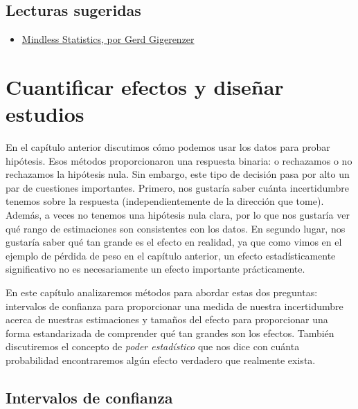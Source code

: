 \documentclass[
  12pt,
]{book}
\providecommand{\tightlist}{%
  \setlength{\itemsep}{0pt}\setlength{\parskip}{0pt}}
\begin{document}
\hypertarget{lecturas-sugeridas-6}{%
\section{Lecturas sugeridas}\label{lecturas-sugeridas-6}}

\begin{itemize}
\tightlist
\item
  \href{https://library.mpib-berlin.mpg.de/ft/gg/GG_Mindless_2004.pdf}{Mindless Statistics, por Gerd Gigerenzer}
\end{itemize}

\hypertarget{ci-effect-size-power}{%
\chapter{Cuantificar efectos y diseñar estudios}\label{ci-effect-size-power}}

En el capítulo anterior discutimos cómo podemos usar los datos para probar hipótesis. Esos métodos proporcionaron una respuesta binaria: o rechazamos o no rechazamos la hipótesis nula. Sin embargo, este tipo de decisión pasa por alto un par de cuestiones importantes. Primero, nos gustaría saber cuánta incertidumbre tenemos sobre la respuesta (independientemente de la dirección que tome). Además, a veces no tenemos una hipótesis nula clara, por lo que nos gustaría ver qué rango de estimaciones son consistentes con los datos. En segundo lugar, nos gustaría saber qué tan grande es el efecto en realidad, ya que como vimos en el ejemplo de pérdida de peso en el capítulo anterior, un efecto estadísticamente significativo no es necesariamente un efecto importante prácticamente.

En este capítulo analizaremos métodos para abordar estas dos preguntas: intervalos de confianza para proporcionar una medida de nuestra incertidumbre acerca de nuestras estimaciones y tamaños del efecto para proporcionar una forma estandarizada de comprender qué tan grandes son los efectos. También discutiremos el concepto de \emph{poder estadístico} que nos dice con cuánta probabilidad encontraremos algún efecto verdadero que realmente exista.

\hypertarget{intervalos-de-confianza}{%
\section{Intervalos de confianza}\label{intervalos-de-confianza}}
\end{document}
